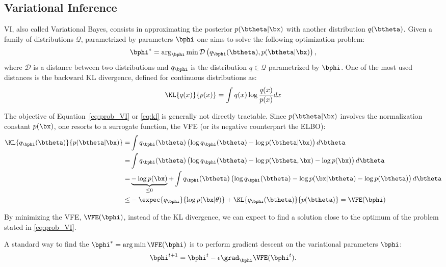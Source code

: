 

\subsection{Variational Inference}

\acf{VI}, also called Variational Bayes, consists in approximating the posterior $p(\btheta|\bx)$ with another distribution $q(\btheta)$.
Given a family of distributions $\mathcal{Q}$, parametrized by parameters $\bphi$ one aims to solve the following optimization problem:
\begin{align}
\bphi^* = \arg_{\bphi}\min \mathcal{D}\left(q_{\bphi}(\btheta), p(\btheta|\bx)\right),
\label{eq:prob_VI}
\end{align}
where $\mathcal{D}$ is a distance between two distributions and $q_{\bphi}$ is the distribution $q\in \mathcal{Q}$ parametrized by $\bphi$.
One of the most used distances is the backward \ac{KL} divergence, defined for continuous distributions as:
\begin{align}
\KL{q(x)}{p(x)} = \int q(x) \log \frac{q(x)}{p(x)}dx
\label{eq:kl}
\end{align}

The objective of Equation~\eqref{eq:prob_VI} or \eqref{eq:kl} is generally not directly tractable.
Since $p(\btheta|\bx)$ involves the normalization constant $p(\bx)$, one resorts to a surrogate function, the \ac{VFE} (or its negative counterpart the \ac{ELBO}):
\begin{align}
\KL{q_{\bphi}(\btheta)}{p(\btheta|\bx)} =& \int q_{\bphi}(\btheta) \left(\log q_{\bphi}(\btheta) - \log p(\btheta|\bx)\right)d\btheta\\
=&\int q_{\bphi}(\btheta) \left(\log q_{\bphi}(\btheta) - \log p(\btheta, \bx) - \log p(\bx)\right)d\btheta\\
=&\underbrace{- \log p(\bx)}_{\leq 0} + \int q_{\bphi}(\btheta) \left(\log q_{\bphi}(\btheta) - \log p(\bx|\btheta)- \log p(\btheta) \right)d\btheta\\
\leq& -\expec{q_{\bphi}}{\log p(\bx|\theta)} + \KL{q_{\bphi}(\btheta)}{p(\btheta)} = \VFE(\bphi)
\end{align}


By minimizing the \ac{VFE}, $\VFE(\bphi)$, instead of the \ac{KL} divergence, we can expect to find a solution close to the optimum of the problem stated in \eqref{eq:prob_VI}.

A standard way to find the $\bphi^* = \arg\min \VFE(\bphi)$ is to perform gradient descent on the variational parameters $\bphi$:
\begin{align}
\bphi^{t+1} = \bphi^{t} - \epsilon \grad_{\bphi}\VFE(\bphi^{t}).
\label{eq:vigraddescent}
\end{align}

